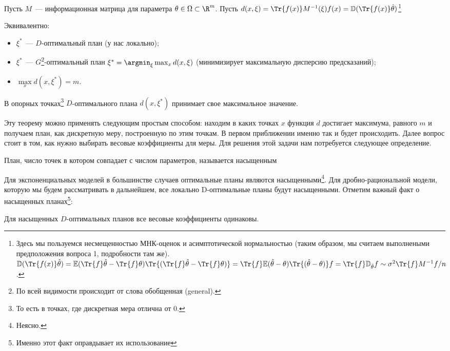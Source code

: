 \begin{thm}
Пусть $M$ — информационная матрица для параметра $\theta \in \Omega \subset \R^m$.
Пусть $d(x,\xi) = \Tr{f(x)}M^{-1}(\xi)f(x) = \mathbb D(\Tr{f(x)}\hat{\theta})$\footnote{
    Здесь мы пользуемся несмещенностью МНК-оценок и асимптотической нормальностью (таким образом, мы считаем выполнеными предположения вопроса 1, подробности там же). $\mathbb D(\Tr{f(x)}\hat{\theta}) = \mathbb E(\Tr{f}\hat{\theta} - \Tr{f}\theta)\Tr{(\Tr{f}\hat{\theta} - \Tr{f}\theta)} = \Tr{f}\mathbb E(\hat{\theta} - \theta)\Tr{(\hat{\theta} - \theta)}f = \Tr{f}\mathbb D_{\hat{\theta}}f \sim  \sigma^2\Tr{f}M^{-1}f / n$.}


Эквивалентно:
\begin{itemize}
\item $\xi^{*}$ — $D$-оптимальный план (у нас локально);
\item $\xi^{*}$ — $G$\footnote{По всей видимости происходит от слова обобщенная (general).}-оптимальный план $\xi^{*} = \argmin_{\xi}\max_{x}d(x, \xi)$ (минимизирует максимальную дисперсию предсказаний);
\item $\max\limits_{x} d(x,\xi^{*}) = m$.
\end{itemize}
В опорных точках\footnote{То есть в точках, где дискретная мера отлична от 0.} $D$-оптимального плана  $d(x, \xi^{*})$ принимает свое максимальное значение.
\end{thm}

Эту теорему можно применять следующим простым способом: находим в каких точках $x$ функция $d$ достигает максимума, равного $m$ и получаем план, как дискретную меру, построенную по этим точкам.
В первом приближении именно так и будет происходить. Далее вопрос стоит в том, как нужно выбирать весовые коэффициенты для меры.
Для решения этой задачи нам потребуется следующее определение.

\begin{dfn}
План, число точек в котором совпадает с числом параметров, называется насыщенным
\end{dfn}

Для экспоненциальных моделей в большинстве случаев оптимальные планы являются насыщенными\footnote{\color{blue} Неясно.}.
Для дробно-рациональной модели, которую мы будем рассматривать в дальнейшем, все локально D-оптимальные планы будут насыщенными. Отметим важный факт о насыщенных планах\footnote{Именно этот факт оправдывает их использование}:
\begin{thm}\label{sec9::thm::equal weights in D-opt plans for exp models}
    Для насыщенных $D$-оптимальных планов все весовые коэффициенты одинаковы.
\end{thm}

